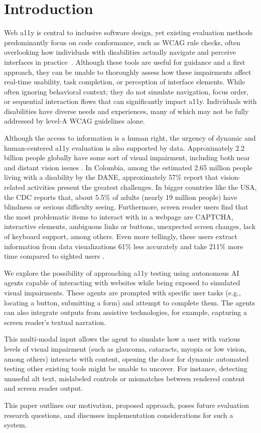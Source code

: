 
\section{Introduction}

Web \ac{a11y} is central to inclusive software design, yet existing evaluation methods predominantly focus on code conformance, such as \ac{WCAG} rule checks, often overlooking how individuals with disabilities actually navigate and perceive interfaces in practice~\cite{ara2024inclusive}. Although these tools are useful for guidance and a first approach, they can be unable to thoroughly assess how these impairments affect real-time usability, task completion, or perception of interface elements. While often ignoring behavioral context; they do not simulate navigation, focus order, or sequential interaction flows that can significantly impact \ac{a11y}. Individuals with disabilities have diverse needs and experiences, many of which may not be fully addressed by level-A \ac{WCAG} guidelines alone.

Although the access to information is a human right, the urgency of dynamic and human-centered \ac{a11y} evaluation is also supported by data. Approximately 2.2 billion people globally have some sort of visual impairment, including both near and distant vision issues \cite{who2023vision}. In Colombia, among the estimated 2.65 million people living with a disability by the DANE, approximately 57\% report that vision-related activities present the greatest challenges\cite{DANE2022}. In bigger countries like the USA, the CDC reports that, about 5.5\% of adults (nearly 19 million people) have blindness or serious difficulty seeing\cite{cdc2025disabilities}. Furthermore, screen reader users find that the most problematic items to interact with in a webpage are CAPTCHA, interactive elements, ambiguous links or buttons, unexpected screen changes, lack of keyboard support, among others\cite{webaimsurvey2025}. Even more tellingly, these users extract information from data visualizations 61\% less accurately and take 211\% more time compared to sighted users \cite{wobbrock2021assets}.

We explore the possibility of approaching \ac{a11y} testing using autonomous \ac{AI} agents capable of interacting with websites while being exposed to simulated visual impairments. These agents are prompted with specific user tasks (e.g., locating a button, submitting a form) and attempt to complete them. The agents can also integrate outputs from assistive technologies, for example, capturing a screen reader's textual narration. 

This multi-modal input allows the agent to simulate how a user with various levels of visual impairment (such as glaucoma, cataracts, myopia or low vision, among others) interacts with content, opening the door for dynamic automated testing other existing tools might be unable to uncover. For instance, detecting unuseful alt text, mislabeled controls or mismatches between rendered content and screen reader output. 

This paper outlines our motivation, proposed approach, poses future evaluation research questions, and discusses implementation considerations for such a system.
